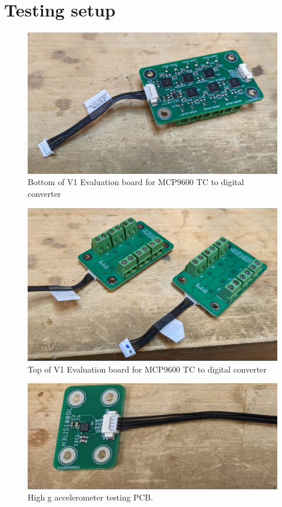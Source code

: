 \documentclass{article}
\begin{document}
\section{Testing setup}
\label{appb}

\begin{figure}[H]
	\centering
	\includegraphics[width=\textwidth]{images/tc-board-bottom}
	\caption{Bottom of V1 Evaluation board for MCP9600 TC to digital converter}
	\label{fig:tc-board-bottom}
\end{figure}

\begin{figure}[h!]
	\centering
	\includegraphics[width=\textwidth]{images/tc-board-top}
	\caption{Top of V1 Evaluation board for MCP9600 TC to digital converter}
	\label{fig:tc-board-top}
\end{figure}

\begin{figure}[h!]
	\centering
	\includegraphics[width=\textwidth]{images/100g-accel-board}
	\caption{High g accelerometer testing PCB.}
	\label{fig:accel-board}
\end{figure}
\end{document}
